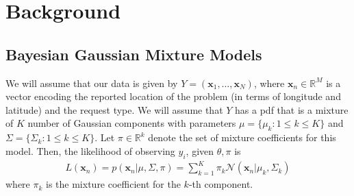 \documentclass[twoside]{article}
\newcommand{\N}{\mathcal{N}}
\newcommand{\bR}{\mathbb{R}}
\newcommand{\vx}{\mathbf{x}}
\theoremstyle{theorem}
\theoremstyle{theorem}
\theoremstyle{theorem}
\theoremstyle{lemma}
\theoremstyle{definition}
\theoremstyle{example}
\begin{document}
\section{Background}
\subsection{Bayesian Gaussian Mixture Models}
We will assume that our data is given by $Y = (\vx_1,\dots , \vx_N )$, where $\vx_n\in \bR^M$ is a vector encoding the reported location of the problem (in terms of longitude and latitude) and the request type. We will assume that $Y$ has a pdf that is a mixture of $K$ number of Gaussian components with parameters $\mu = \{\mu_k :  1\leq k\leq K\}$ and $\Sigma = \{\Sigma_k :  1\leq k\leq K\}$. Let $\pi \in \bR^k$ denote the set of mixture coefficients for this model. Then, the likelihood of observing $y_i$, given $\theta, \pi$ is
\begin{align}
L(\vx_n) = p(\vx_n | \mu, \Sigma, \pi) = \sum_{k=1}^K\pi_k \N(\vx_n | \mu_k, \Sigma_k )
\end{align}
where $\pi_k$ is the mixture coefficient for the $k$-th component. 
\end{document}
